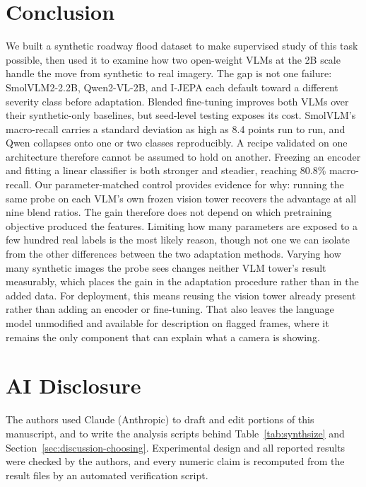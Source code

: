 \documentclass[conference]{IEEEtran}
\begin{document}
\section{Conclusion}

We built a synthetic roadway flood dataset to make supervised study of this task possible, then used it to examine how two open-weight VLMs at the 2B scale handle the move from synthetic to real imagery. The gap is not one failure: SmolVLM2-2.2B, Qwen2-VL-2B, and I-JEPA each default toward a different severity class before adaptation. Blended fine-tuning improves both VLMs over their synthetic-only baselines, but seed-level testing exposes its cost. SmolVLM's macro-recall carries a standard deviation as high as 8.4 points run to run, and Qwen collapses onto one or two classes reproducibly. A recipe validated on one architecture therefore cannot be assumed to hold on another. Freezing an encoder and fitting a linear classifier is both stronger and steadier, reaching 80.8\% macro-recall. Our parameter-matched control provides evidence for why: running the same probe on each VLM's own frozen vision tower recovers the advantage at all nine blend ratios. The gain therefore does not depend on which pretraining objective produced the features. Limiting how many parameters are exposed to a few hundred real labels is the most likely reason, though not one we can isolate from the other differences between the two adaptation methods. Varying how many synthetic images the probe sees changes neither VLM tower's result measurably, which places the gain in the adaptation procedure rather than in the added data. For deployment, this means reusing the vision tower already present rather than adding an encoder or fine-tuning. That also leaves the language model unmodified and available for description on flagged frames, where it remains the only component that can explain what a camera is showing.

\section*{AI Disclosure}

The authors used Claude (Anthropic) to draft and edit portions of this manuscript, and to write the analysis scripts behind Table~\ref{tab:synthsize} and Section~\ref{sec:discussion-choosing}. Experimental design and all reported results were checked by the authors, and every numeric claim is recomputed from the result files by an automated verification script.



\end{document}
